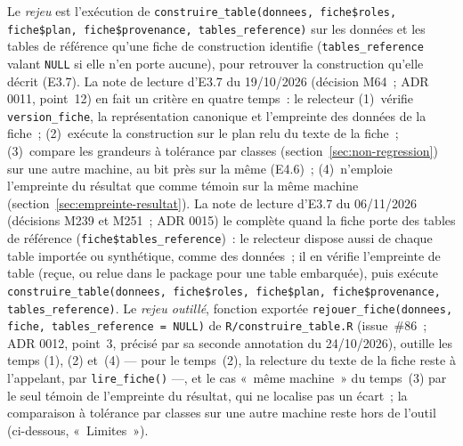 \documentclass[a4paper,11pt]{article}
\newcommand{\code}[1]{\texttt{\small #1}}
\begin{document}
Le \emph{rejeu} est l'exécution de
\code{construire\_table(donnees, fiche\$roles, fiche\$plan, fiche\$provenance, tables\_reference)}
sur les données et les tables de référence qu'une fiche de construction
identifie (\code{tables\_reference} valant \code{NULL} si elle n'en porte
aucune), pour retrouver la
construction qu'elle décrit (E3.7). La note de lecture d'E3.7 du 19/10/2026
(décision M64~; ADR 0011, point~12) en fait un critère en quatre temps~: le
relecteur (1)~vérifie \code{version\_fiche}, la représentation canonique et
l'empreinte des données de la fiche~; (2)~exécute la construction sur le plan
relu du texte de la fiche~; (3)~compare les grandeurs à tolérance par classes
(section~\ref{sec:non-regression}) sur une autre machine, au bit près sur la
même (E4.6)~; (4)~n'emploie l'empreinte du résultat que comme témoin sur la
même machine (section~\ref{sec:empreinte-resultat}). La note de lecture
d'E3.7 du 06/11/2026 (décisions M239 et M251~; ADR 0015) le complète quand
la fiche porte des tables de référence (\code{fiche\$tables\_reference})~:
le relecteur dispose aussi de chaque table importée ou synthétique, comme
des données~; il en vérifie l'empreinte de table (reçue, ou relue dans le
package pour une table embarquée), puis exécute
\code{construire\_table(donnees, fiche\$roles, fiche\$plan, fiche\$provenance, tables\_reference)}.
Le \emph{rejeu outillé},
fonction exportée \code{rejouer\_fiche(donnees, fiche, tables\_reference = NULL)} de
\code{R/construire\_table.R} (issue~\#86~; ADR 0012, point~3, précisé par sa
seconde annotation du 24/10/2026), outille les temps (1), (2) et~(4) ---
pour le temps~(2), la relecture du texte de la fiche reste à l'appelant,
par \code{lire\_fiche()} ---, et le cas «~même machine~» du temps~(3) par le
seul témoin de l'empreinte du résultat, qui ne localise pas un écart~; la
comparaison à tolérance par classes sur une autre machine reste hors de
l'outil (ci-dessous, «~Limites~»).
\end{document}
